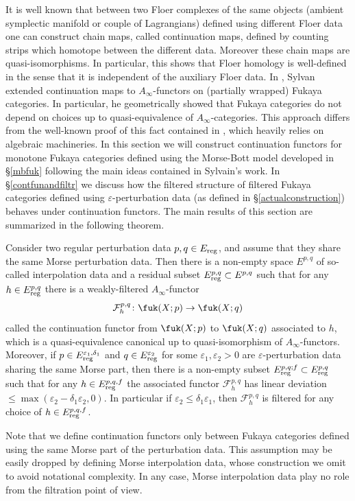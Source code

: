 	It is well known that between two Floer complexes of the same objects (ambient symplectic manifold or couple of Lagrangians) defined using different Floer data one can construct chain maps, called continuation maps, defined by counting strips which homotope between the different data. Moreover these chain maps are quasi-isomorphisms. In particular, this shows that Floer homology is well-defined in the sense that it is independent of the auxiliary Floer data. In \cite{Sylvan2019OnCategories}, Sylvan extended continuation maps to $A_\infty$-functors on (partially wrapped) Fukaya categories. In particular, he geometrically showed that Fukaya categories do not depend on choices up to quasi-equivalence of $A_\infty$-categories. This approach differs from the well-known proof of this fact contained in \cite[Chapter 10]{Se:book-fukaya-categ}, which heavily relies on algebraic machineries. In this section we will construct continuation functors for monotone Fukaya categories defined using the Morse-Bott model developed in \S \ref{mbfuk} following the main ideas contained in Sylvain's work. In \S \ref{contfunandfiltr} we discuss how the filtered structure of filtered Fukaya categories defined using $\varepsilon$-perturbation data (as defined in \S \ref{actualconstruction}) behaves under continuation functors.
	The main results of this section are summarized in the following theorem.
	
	\begin{thm}\label{mainCF}
		Consider two regular perturbation data $p,q\in E_\textnormal{reg}$, and assume that they share the same Morse perturbation data. Then there is a non-empty space $E^{p, q}$ of so-called interpolation data and a residual subset $E^{p, q}_\textnormal{reg}\subset E^{p, q}$ such that for any $h\in E_\textnormal{reg}^{p,q}$ there is a weakly-filtered $A_\infty$-functor $$\mathcal{F}^{p,q}_h\colon \fuk(X;p)\to \fuk(X;q)$$ called the continuation functor from $\fuk(X;p)$ to $\fuk(X;q)$ associated to $h$, which is a quasi-equivalence canonical up to quasi-isomorphism of $A_\infty$-functors. Moreover, if $p\in E^{\varepsilon_1,\delta_1}_\textnormal{reg}$ and $q\in E^{\varepsilon_2}_\textnormal{reg}$ for some $\varepsilon_1,\varepsilon_2>0$ are $\varepsilon$-perturbation data sharing the same Morse part, then there is a non-empty subset $E^{p,q; f}_\textnormal{reg}\subset E^{p, q}_\textnormal{reg}$ such that for any $h\in E^{p,q, f}_\textnormal{reg}$ the associated functor $\mathcal{F}^{p,q}_h$ has linear deviation $\leq \max\left(\varepsilon_2-\delta_1\varepsilon_2,0\right)$. In particular if $\varepsilon_2\leq \delta_1\varepsilon_1$, then $\mathcal{F}^{p,q}_h$ is filtered for any choice of $h\in E^{p, q, f}_\textnormal{reg}$.
	\end{thm}
	\noindent Note that we define continuation functors only between Fukaya categories defined using the same Morse part of the perturbation data. This assumption may be easily dropped by defining Morse interpolation data, whose construction we omit to avoid notational complexity. In any case, Morse interpolation data play no role from the filtration point of view.
	
